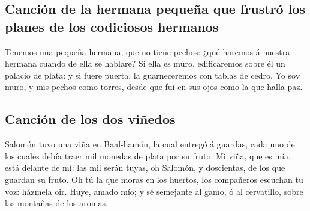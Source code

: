 \hypertarget{canciuxf3n-de-la-hermana-pequeuxf1a-que-frustruxf3-los-planes-de-los-codiciosos-hermanos}{%
\subsection{Canción de la hermana pequeña que frustró los planes de los
codiciosos
hermanos}\label{canciuxf3n-de-la-hermana-pequeuxf1a-que-frustruxf3-los-planes-de-los-codiciosos-hermanos}}

 Tenemos una pequeña hermana, que no tiene pechos: ¿qué
haremos á nuestra hermana cuando de ella se hablare?  Si
ella es muro, edificaremos sobre él un palacio de plata: y si fuere
puerta, la guarneceremos con tablas de cedro.  Yo soy muro,
y mis pechos como torres, desde que fuí en sus ojos como la que halla
paz.

\hypertarget{canciuxf3n-de-los-dos-viuxf1edos}{%
\subsection{Canción de los dos
viñedos}\label{canciuxf3n-de-los-dos-viuxf1edos}}

 Salomón tuvo una viña en Baal-hamón, la cual entregó á
guardas, cada uno de los cuales debía traer mil monedas de plata por su
fruto.  Mi viña, que es mía, está delante de mí: las mil
serán tuyas, oh Salomón, y doscientas, de los que guardan su fruto.
 Oh tú la que moras en los huertos, los compañeros escuchan
tu voz: házmela oir.  Huye, amado mío; y sé semejante al
gamo, ó al cervatillo, sobre las montañas de los aromas.

